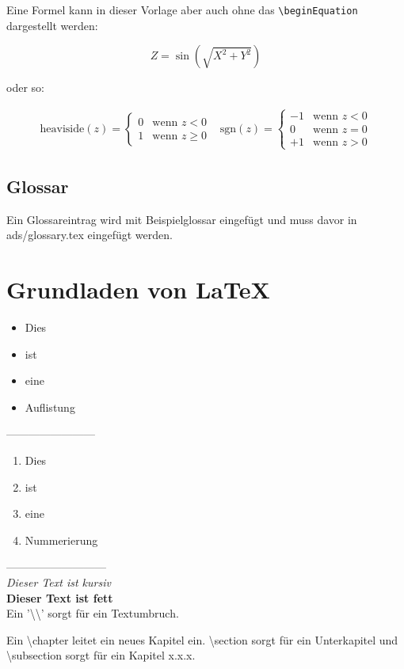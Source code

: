Eine Formel kann in dieser Vorlage aber auch ohne das \texttt{\textbackslash beginEquation} dargestellt werden:

\[Z= \sin(\sqrt{X^2 + Y^2})\] 

oder so:

\[
\begin{array}{cc}
\text{heaviside}(z) = 
\begin{cases} 
0 & \text{wenn } z < 0 \\ 
1 & \text{wenn } z \geq 0 
\end{cases}
&
\text{sgn}(z) = 
\begin{cases} 
-1 & \text{wenn } z < 0 \\ 
0 & \text{wenn } z = 0 \\ 
+1 & \text{wenn } z > 0 
\end{cases}
\end{array}
\]

\section{Glossar}

Ein Glossareintrag wird mit \gls{Beispielglossar} eingefügt und muss davor in ads/glossary.tex eingefügt werden.

\chapter{Grundladen von \LaTeX}

\begin{itemize}
	\item Dies
	\item ist
	\item eine
	\item Auflistung 
\end{itemize}
------------------------
\begin{enumerate}
    \item Dies
    \item ist
    \item eine
    \item Nummerierung
\end{enumerate} 
---------------------------\\
\emph{Dieser Text ist kursiv}\\
\textbf{Dieser Text ist fett}\\

Ein '\textbackslash \textbackslash'  sorgt für ein Textumbruch.

Ein \textbackslash {chapter} leitet ein neues Kapitel ein. \textbackslash {section} sorgt für ein Unterkapitel und \textbackslash {subsection} sorgt für ein Kapitel x.x.x.

